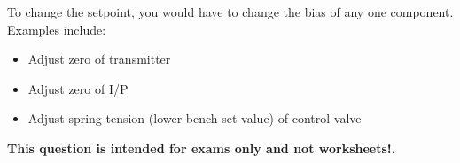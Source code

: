 \vskip 10pt

To change the setpoint, you would have to change the bias of any one component.  Examples include:

\begin{itemize}
\item{} Adjust zero of transmitter
\item{} Adjust zero of I/P
\item{} Adjust spring tension (lower bench set value) of control valve
\end{itemize}







{\bf This question is intended for exams only and not worksheets!}.




